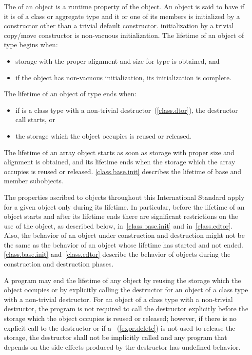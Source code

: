 \pnum
{}%
%
The  of an object is a runtime property of the
object.
An object is said to have  if it is of a class or
aggregate type and it or one of its members is initialized by a constructor
other than a trivial default constructor. \enternote initialization by a
trivial copy/move constructor is non-vacuous initialization. \exitnote
The lifetime of an object of type  begins when:

\begin{itemize}
\item storage with the proper alignment and size for type  is
obtained, and

\item if the object has non-vacuous initialization, its initialization is complete.
\end{itemize}

The lifetime of an object of type  ends when:

\begin{itemize}
\item if  is a class type with a non-trivial
destructor~(\ref{class.dtor}), the destructor call starts, or

\item the storage which the object occupies is reused or released.
\end{itemize}

\pnum
\enternote The lifetime of an array object starts as soon as storage with proper size and
alignment is obtained, and its lifetime ends when the storage which the
array occupies is reused or released. \ref{class.base.init}
describes the lifetime of base and member subobjects. \exitnote

\pnum
The properties ascribed to objects throughout this International
Standard apply for a given object only during its lifetime. \enternote
In particular, before the lifetime of an object starts and after its
lifetime ends there are significant restrictions on the use of the
object, as described below, in~\ref{class.base.init} and
in~\ref{class.cdtor}. Also, the behavior of an object under construction
and destruction might not be the same as the behavior of an object whose
lifetime has started and not ended. \ref{class.base.init}
and~\ref{class.cdtor} describe the behavior of objects during the
construction and destruction phases. \exitnote

\pnum
A program may end the lifetime of any object by reusing the storage
which the object occupies or by explicitly calling the destructor for an
object of a class type with a non-trivial destructor. For an object of a
class type with a non-trivial destructor, the program is not required to
call the destructor explicitly before the storage which the object
occupies is reused or released; however, if there is no explicit call to
the destructor or if a ~(\ref{expr.delete})
is not used to release the storage, the destructor shall not be
implicitly called and any program that depends on the side effects
produced by the destructor has undefined behavior.

